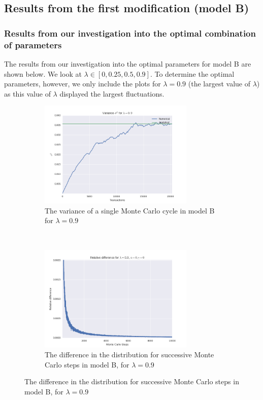 \documentclass[a4paper, 10pt]{article}
\begin{document}
\subsection{Results from the first modification (model B)}
\subsubsection{Results from our investigation into the optimal combination of parameters}
The results from our investigation into the optimal parameters for model B are shown below. We look at $\lambda \in [0,0.25, 0.5, 0.9]$. To determine the optimal parameters, however, we only include the plots for $\lambda = 0.9$ (the largest value of $\lambda$) as this value of $\lambda$ displayed the largest fluctuations.
\begin{figure}[!ht] %
    \centering
    \begin{subfigure}[H!]{0.5\textwidth}
        \centering
        \includegraphics[height=2.0in]{varLamb09.png} %
        \caption{The variance of a single Monte Carlo cycle in model B for $\lambda = 0.9$}\label{fig:ModelB_Var}
    \end{subfigure}%
    ~ 
    \begin{subfigure}[H!]{0.5\textwidth}
        \centering
        \includegraphics[height=2.0in]{relDiffL09A0G0.png}
        \caption{The difference in the distribution for successive Monte Carlo steps in model B, for $\lambda = 0.9$}\label{fig:ModelB_MC_steps}
    \end{subfigure}

\end{figure}
\end{document}
